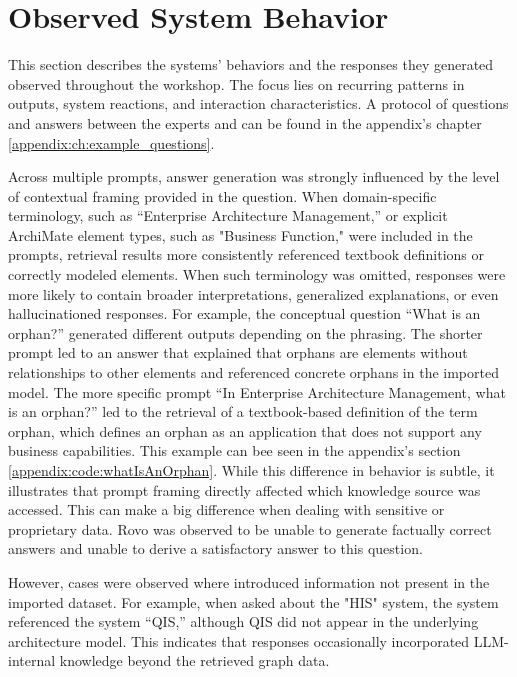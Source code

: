 \section{Observed System Behavior}
\label{sec:observedSysBehavior}
This section describes the systems' behaviors and the responses they generated observed throughout the workshop. The focus lies on recurring patterns in outputs, system reactions, and interaction characteristics. A protocol of questions and answers between the experts and \prototype{} can be found in the appendix's chapter \ref{appendix:ch:example_questions}.

Across multiple prompts, answer generation was strongly influenced by the level of contextual framing provided in the question. When domain-specific terminology, such as “Enterprise Architecture Management,” or explicit ArchiMate element types, such as "Business Function," were included in the prompts, retrieval results more consistently referenced textbook definitions or correctly modeled elements. When such terminology was omitted, responses were more likely to contain broader interpretations, generalized explanations, or even hallucinationed responses. For example, the conceptual question “What is an orphan?” generated different outputs depending on the phrasing. The shorter prompt led to an answer that explained that orphans are elements without relationships to other elements and referenced concrete orphans in the imported model. The more specific prompt “In Enterprise Architecture Management, what is an orphan?” led to the retrieval of a textbook-based definition of the term orphan, which defines an orphan as an application that does not support any business capabilities. This example can bee seen in the appendix's section \ref{appendix:code:whatIsAnOrphan}. While this difference in behavior is subtle, it illustrates that prompt framing directly affected which knowledge source was accessed. This can make a big difference when dealing with sensitive or proprietary data. Rovo was observed to be unable to generate factually correct answers and unable to derive a satisfactory answer to this question.

However, cases were observed where \prototype{} introduced information not present in the imported dataset. For example, when asked about the "HIS" system, the system referenced the system “QIS,” although QIS did not appear in the underlying architecture model. This indicates that responses occasionally incorporated LLM-internal knowledge beyond the retrieved graph data.


